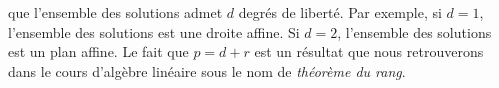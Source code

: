 \documentclass{magnoliaold}
\begin{document}
\begin{remarques}
  que l'ensemble des solutions admet $d$ degrés de liberté. Par exemple,
  si $d=1$, l'ensemble des solutions est une droite affine. Si $d=2$, l'ensemble des
  solutions est un plan affine. Le fait que $p=d+r$ est un résultat que nous
  retrouverons dans le cours d'algèbre linéaire sous le nom de \emph{théorème du rang}.
\end{remarques}
\end{document}
